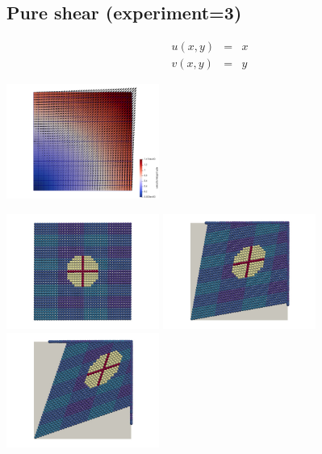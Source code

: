 \newpage
\subsection*{Pure shear (experiment=3)}

\begin{eqnarray}
u(x,y)&=&x \\
v(x,y)&=&y
\end{eqnarray}


\includegraphics[width=5cm]{python_codes/fieldstone_89/results/pureshear/vel}


\includegraphics[width=5cm]{python_codes/fieldstone_89/results/pureshear/paint0000}
\includegraphics[width=5cm]{python_codes/fieldstone_89/results/pureshear/paint0005}
\includegraphics[width=5cm]{python_codes/fieldstone_89/results/pureshear/paint0010}


